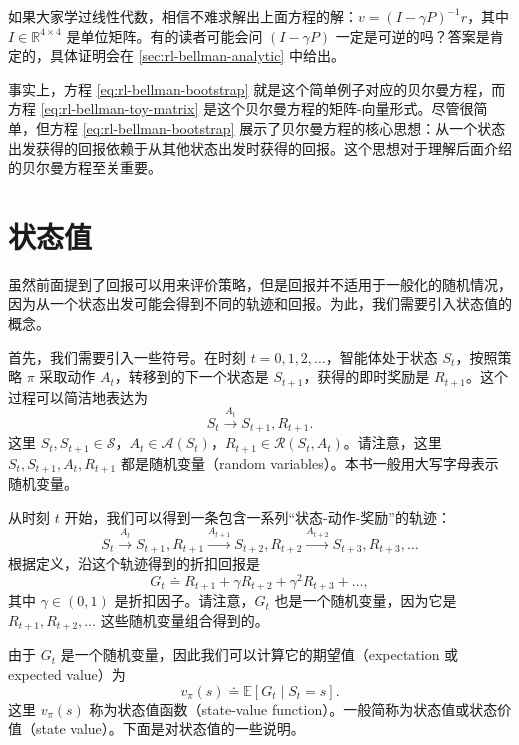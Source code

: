 如果大家学过线性代数，相信不难求解出上面方程的解：$v = (I - \gamma P)^{-1} r$，其中 $I \in \mathbb{R}^{4 \times 4}$ 是单位矩阵。有的读者可能会问 $(I - \gamma P)$ 一定是可逆的吗？答案是肯定的，具体证明会在 \cref{sec:rl-bellman-analytic} 中给出。

事实上，方程 \cref{eq:rl-bellman-bootstrap} 就是这个简单例子对应的贝尔曼方程，而方程 \cref{eq:rl-bellman-toy-matrix} 是这个贝尔曼方程的矩阵-向量形式。尽管很简单，但方程 \cref{eq:rl-bellman-bootstrap} 展示了贝尔曼方程的核心思想：从一个状态出发获得的回报依赖于从其他状态出发时获得的回报。这个思想对于理解后面介绍的贝尔曼方程至关重要。

\section{状态值}
\label{sec:rl-bellman-state-value}

虽然前面提到了回报可以用来评价策略，但是回报并不适用于一般化的随机情况，因为从一个状态出发可能会得到不同的轨迹和回报。为此，我们需要引入状态值的概念。

首先，我们需要引入一些符号。在时刻 $t = 0,1,2,\ldots$，智能体处于状态 $S_t$，按照策略 $\pi$ 采取动作 $A_t$，转移到的下一个状态是 $S_{t+1}$，获得的即时奖励是 $R_{t+1}$。这个过程可以简洁地表达为
\begin{equation*}
S_t \xrightarrow{A_t} S_{t+1}, R_{t+1}.
\end{equation*}
这里 $S_t, S_{t+1} \in \mathcal{S}$，$A_t \in \mathcal{A}(S_t)$，$R_{t+1} \in \mathcal{R}(S_t, A_t)$。请注意，这里 $S_t, S_{t+1}, A_t, R_{t+1}$ 都是随机变量（random variables）。本书一般用大写字母表示随机变量。

从时刻 $t$ 开始，我们可以得到一条包含一系列“状态-动作-奖励”的轨迹：
\begin{equation*}
S_t \xrightarrow{A_t} S_{t+1}, R_{t+1} \xrightarrow{A_{t+1}} S_{t+2}, R_{t+2} \xrightarrow{A_{t+2}} S_{t+3}, R_{t+3}, \ldots
\end{equation*}
根据定义，沿这个轨迹得到的折扣回报是
\begin{equation*}
G_t \doteq R_{t+1} + \gamma R_{t+2} + \gamma^2 R_{t+3} + \dots ,
\end{equation*}
其中 $\gamma \in (0,1)$ 是折扣因子。请注意，$G_t$ 也是一个随机变量，因为它是 $R_{t+1}, R_{t+2}, \ldots$ 这些随机变量组合得到的。

由于 $G_t$ 是一个随机变量，因此我们可以计算它的期望值（expectation 或 expected value）为
\begin{equation}
v_\pi(s) \doteq \mathbb{E}[G_t \mid S_t = s].
\label{eq:rl-bellman-state-value-def}
\end{equation}
这里 $v_\pi(s)$ 称为状态值函数（state-value function）。一般简称为状态值或状态价值（state value）。下面是对状态值的一些说明。

